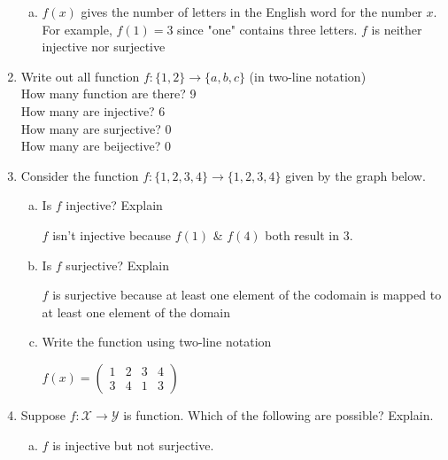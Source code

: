 \documentclass[11pt, a4paper]{article}
\newcommand\setItemNumber[1]{\setcounter{enumi}{\numexpr#1-1\relax}}
\begin{document}
\begin{enumerate}
\begin{enumerate}[(a)]
                \item $f(x)$ gives the number of letters in the English word for the number $x$. For example, $f(1) = 3$ since "one" contains three letters.\newline
                    $f$ is neither injective nor surjective
            \end{enumerate}


        \setItemNumber{6}
    \item Write out all function $f : \{1,2\}\rightarrow \{a,b,c\}$ (in two-line notation)\\
        How many function are there? 9\\
        How many are injective? 6\\
        How many are surjective? 0\\
        How many are beijective? 0\\

    \setItemNumber{8}
    \item Consider the function $f : \{1,2,3,4\}\rightarrow \{1,2,3,4\}$ given by the graph below.
        \begin{enumerate}[(a)]
            \item Is $f$ injective? Explain

                $f$ isn't injective because $f(1)$ \& $f(4)$ both result in 3.

            \item Is $f$ surjective? Explain

                $f$ is surjective because at least one element of the codomain is mapped to at least one element of the domain

            \item Write the function using two-line notation

                $f(x) =  \begin{pmatrix} 1 & 2 & 3 & 4 \\ 3 & 4 & 1 & 3 \end{pmatrix}$
        \end{enumerate}


    \setItemNumber{19}
\item Suppose $f : \mathcal{X} \rightarrow \mathcal{Y}$ is function. Which of the following are possible? Explain.
        \begin{enumerate}[(a)]
            \item $f$ is injective but not surjective.


\end{enumerate}
\end{enumerate}
\end{document}
